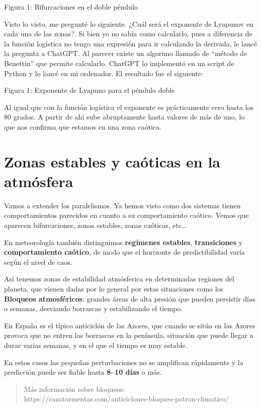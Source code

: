 \documentclass[
  11pt,
  a4paper,
  DIV=11,
  numbers=noendperiod]{scrreprt}
\begin{document}
Figura 1: Bifurcaciones en el doble péndulo

Visto lo visto, me pregunté lo siguiente. ¿Cuál será el exponente de
Lyapunov en cada una de las zonas?. Si bien yo no sabía como calcularlo,
pues a diferencia de la función logística no tengo una expresión para ir
calculando la derivada, le lancé la pregunta a ChatGPT. Al parecer
existe un algorimo llamado de ``método de Benettin'' que permite
calcularlo. ChatGPT lo implementó en un script de Python y lo lancé en
mi ordenador. El resultado fue el siguiente:

Figura 1: Exponente de Lyapuno para el péndulo doble

Al igual que con la función logística el exponente es prácticamente cero
hasta los 80 grados. A partir de ahí sube abruptamente hasta valores de
más de uno, lo que nos confirma que estamos en una zona caótica.

\section{Zonas estables y caóticas en la
atmósfera}\label{zonas-estables-y-cauxf3ticas-en-la-atmuxf3sfera}

Vamos a extender los paralelismos. Ya hemos visto como dos sistemas
tienen comportamientos parecidos en cuanto a su comportamiento caótico.
Vemos que aparecen bifurcaciones, zonas estables, zonas caóticas,
etc\ldots{}

En meteorología también distinguimos \textbf{regímenes estables},
\textbf{transiciones} y \textbf{comportamiento caótico}, de modo que el
horizonte de predictibilidad varía según el nivel de caos.

Así tenemos zonas de estabilidad atmósferica en determinadas regiones
del planeta, que vienen dadas por lo general por estas situaciones como
los \textbf{Bloqueos atmosféricos}: grandes áreas de alta presión que
pueden persistir días o semanas, desviando borrascas y estabilizando el
tiempo.

En España es el típico anticiclón de las Azores, que cuando se sitúa en
las Azores provoca que no entren las borrascas en la península,
situación que puede llegar a durar varias semanas, y en el que el tiempo
es muy estable.

En estos casos las pequeñas perturbaciones no se amplifican rápidamente
y la predicción puede ser fiable hasta \textbf{8--10 días} o más.

\begin{quote}
Más información sobre bloqueos:\\
https://cazatormentas.com/anticiclones-bloqueo-patron-climatico/
\end{quote}
\end{document}
